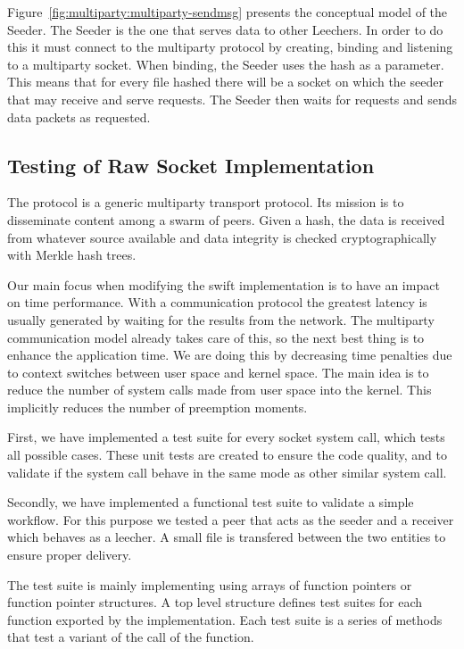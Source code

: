 Figure~\ref{fig:multiparty:multiparty-sendmsg} presents the conceptual model
of the Seeder. The Seeder is the one that serves data to other Leechers. In
order to do this it must connect to the multiparty protocol by creating,
binding and listening to a multiparty socket. When binding, the Seeder
uses the hash as a parameter. This means that for every file hashed there will
be a socket on which the seeder that may receive and serve requests. The Seeder
then waits for requests and sends data packets as requested.

\subsection{Testing of Raw Socket Implementation}

The  protocol is a generic multiparty transport protocol. Its mission is to
disseminate content among a swarm of peers.  Given a hash, the data is
received from whatever source available and data integrity is checked
cryptographically with Merkle hash trees. 

Our main focus when modifying the swift implementation is to have an impact on
time performance. With a communication protocol the greatest latency is
usually generated by waiting for the results from the network. The multiparty
communication model already takes care of this, so the next best thing is to
enhance the application time. We are doing this by decreasing time
penalties due to context switches between user space and kernel space. The
main idea is to reduce the number of system calls made from user space into
the kernel. This implicitly reduces the number of preemption moments.

First, we have implemented a test suite for every socket system call, which
tests all possible cases. These unit tests are created to ensure the code
quality, and to validate if the system call behave in the same mode as other
similar system call.

Secondly, we have implemented a functional test suite to validate a simple
workflow. For this purpose we tested a peer that acts as the seeder and a
receiver which behaves as a leecher. A small file is transfered between the
two entities to ensure proper delivery.

The test suite is mainly implementing using arrays of function pointers or
function pointer structures. A top level structure defines test suites for
each function exported by the implementation. Each test suite is a series of
methods that test a variant of the call of the function.

